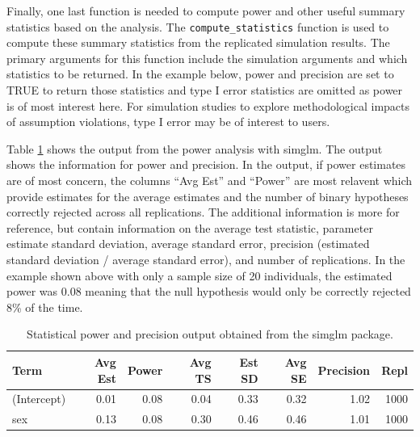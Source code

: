 \documentclass[man,mask,floatsintext]{apa6}
\newenvironment{Shaded}{\begin{snugshade}}{\end{snugshade}}
\newcommand{\DataTypeTok}[1]{\textcolor[rgb]{0.13,0.29,0.53}{#1}}
\newcommand{\KeywordTok}[1]{\textcolor[rgb]{0.13,0.29,0.53}{\textbf{#1}}}
\newcommand{\NormalTok}[1]{#1}
\newcommand{\OperatorTok}[1]{\textcolor[rgb]{0.81,0.36,0.00}{\textbf{#1}}}
\newcommand{\OtherTok}[1]{\textcolor[rgb]{0.56,0.35,0.01}{#1}}
\newcommand{\StringTok}[1]{\textcolor[rgb]{0.31,0.60,0.02}{#1}}
\begin{document}
Finally, one last function is needed to compute power and other useful summary statistics based on the analysis. The \texttt{compute\_statistics} function is used to compute these summary statistics from the replicated simulation results. The primary arguments for this function include the simulation arguments and which statistics to be returned. In the example below, power and precision are set to TRUE to return those statistics and type I error statistics are omitted as power is of most interest here. For simulation studies to explore methodological impacts of assumption violations, type I error may be of interest to users.

\begin{Shaded}
\end{Shaded}

Table \ref{tab:compute-stat-tab} shows the output from the power analysis with simglm. The output shows the information for power and precision. In the output, if power estimates are of most concern, the columns \enquote{Avg Est} and \enquote{Power} are most relavent which provide estimates for the average estimates and the number of binary hypotheses correctly rejected across all replications. The additional information is more for reference, but contain information on the average test statistic, parameter estimate standard deviation, average standard error, precision (estimated standard deviation / average standard error), and number of replications. In the example shown above with only a sample size of 20 individuals, the estimated power was 0.08 meaning that the null hypothesis would only be correctly rejected 8\% of the time.

\begin{table}[t]

\caption{\label{tab:compute-stat-tab}Statistical power and precision output obtained from the simglm package.}
\centering
\begin{tabular}{lrrrrrrr}
\toprule
Term & Avg Est & Power & Avg TS & Est SD & Avg SE & Precision & Repl\\
\midrule
(Intercept) & 0.01 & 0.08 & 0.04 & 0.33 & 0.32 & 1.02 & 1000\\
sex & 0.13 & 0.08 & 0.30 & 0.46 & 0.46 & 1.01 & 1000\\
\bottomrule
\end{tabular}
\end{table}
\end{document}
